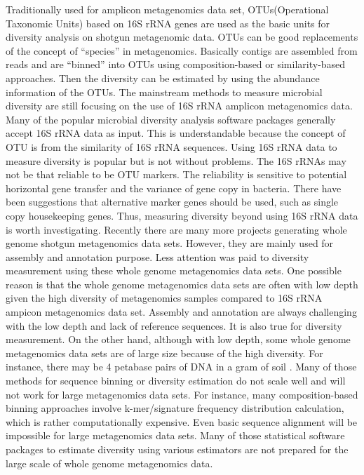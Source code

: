 Traditionally used for amplicon metagenomics data set, OTUs(Operational
Taxonomic Units) based on 16S rRNA genes are used as the basic units for
diversity analysis on shotgun metagenomic data. OTUs can be good replacements
of the concept of ``species'' in metagenomics. Basically contigs are assembled
from reads and are ``binned'' into OTUs using composition-based or
similarity-based approaches. Then the diversity can be estimated by using the
abundance information of the OTUs. The mainstream methods to measure microbial
diversity are still focusing on the use of 16S rRNA amplicon metagenomics data.
Many of the popular microbial diversity analysis software packages generally
accept 16S rRNA data as input. This is understandable because the concept of
OTU is from the similarity of 16S rRNA sequences. Using 16S rRNA data to
measure diversity is popular but is not without problems. The 16S rRNAs may not be
that reliable to be OTU markers. The reliability is sensitive to potential
horizontal gene transfer and the variance of gene copy in bacteria. There have
been suggestions that alternative marker genes should be used, such as single
copy housekeeping genes. Thus, measuring diversity beyond using 16S rRNA data is 
worth investigating.
% 
Recently there are many more projects generating whole genome shotgun
metagenomics data sets. However, they are mainly used for assembly and
annotation purpose. Less attention was paid to diversity measurement using
these whole genome metagenomics data sets. One possible reason is that the
whole genome metagenomics data sets are often with low depth given the high
diversity of metagenomics samples compared to 16S rRNA ampicon metagenomics
data set. Assembly and annotation are always challenging with the low depth and
lack of reference sequences. It is also true for diversity measurement. On the
other hand, although with low depth, some whole genome metagenomics data sets
are of large size because of the high diversity. For instance, there may be 4
petabase pairs of DNA in a gram of soil \cite{Zarraonaindia:2013aa}. Many of
those methods for sequence binning or diversity estimation do not scale well
and will not work for large metagenomics data sets. For instance, many
composition-based binning approaches involve k-mer/signature frequency
distribution calculation, which is rather computationally expensive. Even basic
sequence alignment will be impossible for large metagenomics data sets. Many of
those statistical software packages to estimate diversity using various
estimators are not prepared for the large scale of whole genome metagenomics
data.


